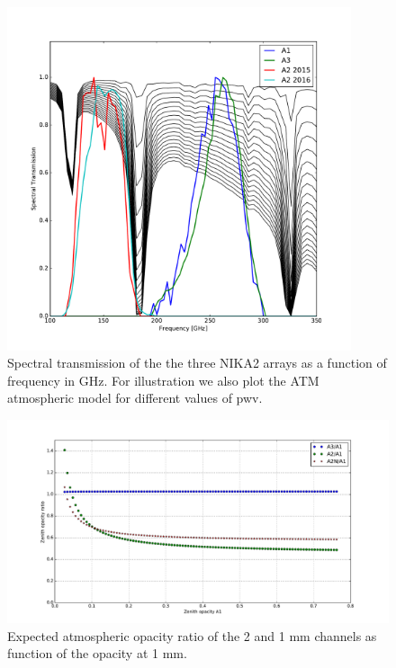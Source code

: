 \begin{figure}[ht] %
\begin{center}
\includegraphics[width=0.9\textwidth]{Figures/SpectralBands/atm_transmission.pdf}
\caption{Spectral transmission of the the three NIKA2 arrays as a function of frequency in GHz. For illustration we also plot the ATM atmospheric model for different values of pwv. \label{spectralband}}
\end{center}
\end{figure}

\begin{figure}[ht] %
\begin{center}
\includegraphics[width=\textwidth]{Figures/SpectralBands/opacity_ratio_vs_tau1.pdf}
\caption{Expected atmospheric opacity ratio of the 2 and 1 mm channels as function of the opacity at 1 mm. \label{thopacities}}
\end{center}
\end{figure}




